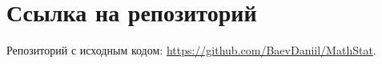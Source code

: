 \section{Ссылка на репозиторий}
\begin{flushleft}
	Репозиторий с исходным кодом: \url{https://github.com/BaevDaniil/MathStat}.
\end{flushleft}